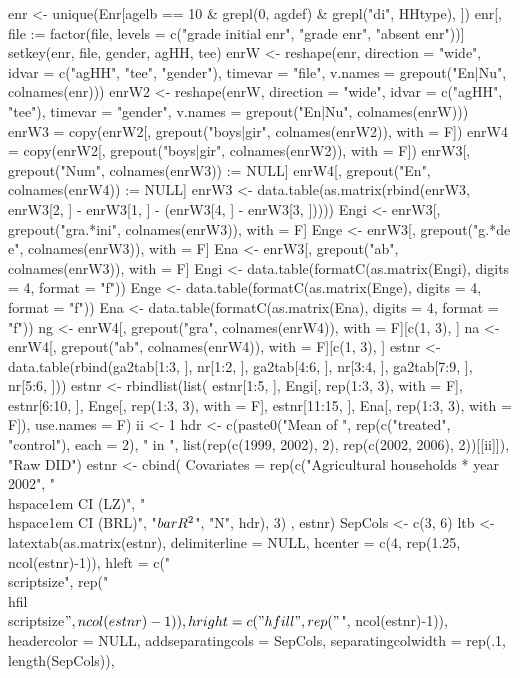 \begin{Schunk}
\begin{Sinput}
enr <- unique(Enr[agelb == 10 & grepl(0, agdef) & grepl("di", HHtype), ])
enr[, file := factor(file, levels = c("grade initial enr", "grade enr", "absent enr"))]
setkey(enr, file, gender, agHH, tee)
enrW <- reshape(enr, direction = "wide", idvar = c("agHH", "tee", "gender"),
  timevar = "file", v.names = grepout("En|Nu", colnames(enr)))
enrW2 <- reshape(enrW, direction = "wide", idvar = c("agHH", "tee"),
  timevar = "gender", v.names = grepout("En|Nu", colnames(enrW)))
enrW3 = copy(enrW2[, grepout("boys|gir", colnames(enrW2)), with = F])
enrW4 = copy(enrW2[, grepout("boys|gir", colnames(enrW2)), with = F])
enrW3[, grepout("Num", colnames(enrW3)) := NULL]
enrW4[, grepout("En", colnames(enrW4)) := NULL]
enrW3 <- data.table(as.matrix(rbind(enrW3, enrW3[2, ] - enrW3[1, ] - (enrW3[4, ] - enrW3[3, ]))))
Engi <- enrW3[, grepout("gra.*ini", colnames(enrW3)), with = F]
Enge <- enrW3[, grepout("g.*de e", colnames(enrW3)), with = F]
Ena <- enrW3[, grepout("ab", colnames(enrW3)), with = F]
Engi <- data.table(formatC(as.matrix(Engi), digits = 4, format = "f"))
Enge <- data.table(formatC(as.matrix(Enge), digits = 4, format = "f"))
Ena <- data.table(formatC(as.matrix(Ena), digits = 4, format = "f"))
ng <- enrW4[, grepout("gra", colnames(enrW4)), with = F][c(1, 3), ]
na <- enrW4[, grepout("ab", colnames(enrW4)), with = F][c(1, 3), ]
estnr <- data.table(rbind(ga2tab[1:3, ], nr[1:2, ], ga2tab[4:6, ], nr[3:4, ], ga2tab[7:9, ], nr[5:6, ]))
estnr <- rbindlist(list(
  estnr[1:5, ], Engi[, rep(1:3, 3), with = F], 
  estnr[6:10, ], Enge[, rep(1:3, 3), with = F],
  estnr[11:15, ], Ena[, rep(1:3, 3), with = F]),
  use.names = F)
ii <- 1
hdr <- c(paste0("Mean of ", rep(c("treated", "control"), each = 2), " in ", 
   list(rep(c(1999, 2002), 2), rep(c(2002, 2006), 2))[[ii]]), "Raw DID")
estnr <- cbind(
  Covariates = rep(c("Agricultural households * year 2002", 
      "\\hspace{1em} CI (LZ)", 
      "\\hspace{1em} CI (BRL)", 
      "$\\bar{R}^{2}$", "N", hdr), 3)
  , estnr)
SepCols <- c(3, 6) 
ltb <- latextab(as.matrix(estnr), delimiterline = NULL, 
    hcenter = c(4, rep(1.25, ncol(estnr)-1)),
    hleft = c("\\scriptsize", rep("\\hfil\\scriptsize$", ncol(estnr)-1)), 
    hright = c("\\hfill", rep("$", ncol(estnr)-1)),
    headercolor = NULL, 
    addseparatingcols = SepCols, separatingcolwidth = rep(.1, length(SepCols)), 

\end{Sinput}
\end{Schunk}
